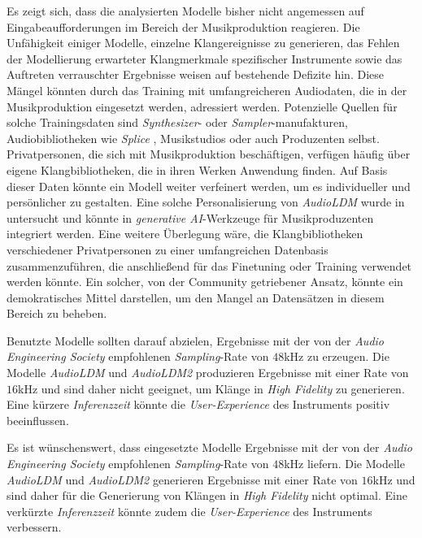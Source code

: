 \documentclass[
  a4paper,  %
  twoside,  %
  bibliography=totoc,
  headsepline,
  cleardoublepage=empty,
  parskip=half,
  draft=false
]{scrbook}
\begin{document}
Es zeigt sich, dass die analysierten Modelle bisher nicht angemessen auf Eingabeaufforderungen im Bereich der Musikproduktion reagieren. Die Unfähigkeit einiger Modelle, einzelne Klangereignisse zu generieren, das Fehlen der Modellierung erwarteter Klangmerkmale spezifischer Instrumente sowie das Auftreten verrauschter Ergebnisse weisen auf bestehende Defizite hin. Diese Mängel könnten durch das Training mit umfangreicheren Audiodaten, die in der Musikproduktion eingesetzt werden, adressiert werden. Potenzielle Quellen für solche Trainingsdaten sind \emph{Synthesizer}- oder \emph{Sampler}-manufakturen, Audiobibliotheken wie \emph{Splice} \cite{noauthor_royalty-free_nodate}, Musikstudios oder auch Produzenten selbst. Privatpersonen, die sich mit Musikproduktion beschäftigen, verfügen häufig über eigene Klangbibliotheken, die in ihren Werken Anwendung finden. Auf Basis dieser Daten könnte ein Modell weiter verfeinert werden, um es individueller und persönlicher zu gestalten. Eine solche Personalisierung von \emph{AudioLDM} \cite{liu_audioldm_2023} wurde in \cite{plitsis_investigating_2023} untersucht und könnte in \emph{generative AI}-Werkzeuge für Musikproduzenten integriert werden. Eine weitere Überlegung wäre, die Klangbibliotheken verschiedener Privatpersonen zu einer umfangreichen Datenbasis zusammenzuführen, die anschließend für das Finetuning oder Training verwendet werden könnte. Ein solcher, von der Community getriebener Ansatz, könnte ein demokratisches Mittel darstellen, um den Mangel an Datensätzen in diesem Bereich zu beheben. 

Benutzte Modelle sollten darauf abzielen, Ergebnisse mit der von der \emph{Audio Engineering Society} empfohlenen \emph{Sampling}-Rate von $48$kHz \cite{audio_engineering_society_inc_aes5-2018_2018} zu erzeugen. Die Modelle \emph{AudioLDM} \cite{liu_audioldm_2023} und \emph{AudioLDM2} \cite{liu_audioldm2_2023} produzieren Ergebnisse mit einer Rate von $16$kHz und sind daher nicht geeignet, um Klänge in \emph{High Fidelity} zu generieren. Eine kürzere \emph{Inferenzzeit} könnte die \emph{User-Experience} des Instruments positiv beeinflussen.

Es ist wünschenswert, dass eingesetzte Modelle Ergebnisse mit der von der \emph{Audio Engineering Society} empfohlenen \emph{Sampling}-Rate von $48$kHz \cite{audio_engineering_society_inc_aes5-2018_2018} liefern. Die Modelle \emph{AudioLDM} \cite{liu_audioldm_2023} und \emph{AudioLDM2} \cite{liu_audioldm2_2023} generieren Ergebnisse mit einer Rate von $16$kHz und sind daher für die Generierung von Klängen in \emph{High Fidelity} nicht optimal. Eine verkürzte \emph{Inferenzzeit} könnte zudem die \emph{User-Experience} des Instruments verbessern.
\end{document}
